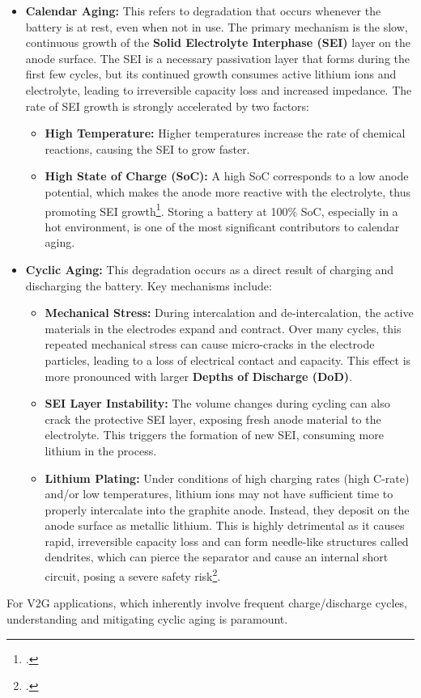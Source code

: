 \begin{itemize}
    \item \textbf{Calendar Aging:} This refers to degradation that occurs whenever the battery is at rest, even when not in use. The primary mechanism is the slow, continuous growth of the \textbf{Solid Electrolyte Interphase (SEI)} layer on the anode surface. The SEI is a necessary passivation layer that forms during the first few cycles, but its continued growth consumes active lithium ions and electrolyte, leading to irreversible capacity loss and increased impedance. The rate of SEI growth is strongly accelerated by two factors:
    \begin{itemize}
        \item \textbf{High Temperature:} Higher temperatures increase the rate of chemical reactions, causing the SEI to grow faster.
        \item \textbf{High State of Charge (SoC):} A high SoC corresponds to a low anode potential, which makes the anode more reactive with the electrolyte, thus promoting SEI growth\footcite{vetter2022ageing}. Storing a battery at 100\% SoC, especially in a hot environment, is one of the most significant contributors to calendar aging.
    \end{itemize}

    \item \textbf{Cyclic Aging:} This degradation occurs as a direct result of charging and discharging the battery. Key mechanisms include:
    \begin{itemize}
        \item \textbf{Mechanical Stress:} During intercalation and de-intercalation, the active materials in the electrodes expand and contract. Over many cycles, this repeated mechanical stress can cause micro-cracks in the electrode particles, leading to a loss of electrical contact and capacity. This effect is more pronounced with larger \textbf{Depths of Discharge (DoD)}.
        \item \textbf{SEI Layer Instability:} The volume changes during cycling can also crack the protective SEI layer, exposing fresh anode material to the electrolyte. This triggers the formation of new SEI, consuming more lithium in the process.
        \item \textbf{Lithium Plating:} Under conditions of high charging rates (high C-rate) and/or low temperatures, lithium ions may not have sufficient time to properly intercalate into the graphite anode. Instead, they deposit on the anode surface as metallic lithium. This is highly detrimental as it causes rapid, irreversible capacity loss and can form needle-like structures called dendrites, which can pierce the separator and cause an internal short circuit, posing a severe safety risk\footcite{birkl2017degradation}.
    \end{itemize}
\end{itemize}
For V2G applications, which inherently involve frequent charge/discharge cycles, understanding and mitigating cyclic aging is paramount.

